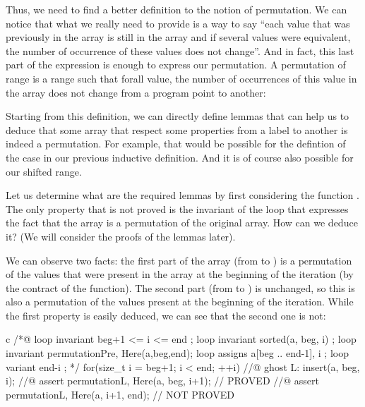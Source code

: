 Thus, we need to find a better definition to the notion of permutation. We can
notice that what we really need to provide is a way to say ``each value that
was previously in the array is still in the array and if several values were
equivalent, the number of occurrence of these values does not change''. And in
fact, this last part of the expression is enough to express our permutation.
A permutation of range is a range such that forall value, the number of
occurrences of this value in the array does not change from a program point to
another:






Starting from this definition, we can directly define lemmas that can help us
to deduce that some array that respect some properties from a label to another
is indeed a permutation. For example, that would be possible for the defintion
of the case  in our previous inductive definition. And it is
of course also possible for our shifted range.




Let us determine what are the required lemmas by first considering the function
. The only property that is not proved is the invariant
of the loop that expresses the fact that the array is a permutation of the
original array. How can we deduce it? (We will consider the proofs of the lemmas
later).




We can observe two facts: the first part of the array (from  to
) is a permutation of the values that were present in the array
at the beginning of the iteration (by the contract of the 
function). The second part (from  to ) is
unchanged, so this is also a permutation of the values present at the beginning
of the iteration. While the first property is easily deduced, we can see that
the second one is not:



\begin{CodeBlock}{c}
  /*@
    loop invariant beg+1 <= i <= end ;
    loop invariant sorted(a, beg, i) ;
    loop invariant permutation{Pre, Here}(a,beg,end);
    loop assigns a[beg .. end-1], i ;
    loop variant end-i ;
  */
  for(size_t i = beg+1; i < end; ++i) {
    //@ ghost L:
    insert(a, beg, i);
    //@ assert permutation{L, Here}(a, beg, i+1); // PROVED
    //@ assert permutation{L, Here}(a, i+1, end); // NOT PROVED
  }
\end{CodeBlock}

